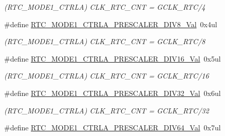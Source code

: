 \begin{DoxyCompactItemize}
\begin{DoxyCompactList}\small\item\em (R\+T\+C\+\_\+\+M\+O\+D\+E1\+\_\+\+C\+T\+R\+L\+A) C\+L\+K\+\_\+\+R\+T\+C\+\_\+\+C\+N\+T = G\+C\+L\+K\+\_\+\+R\+T\+C/4 \end{DoxyCompactList}\item 
\hypertarget{group___s_a_m_l21___r_t_c_gadb7983b0157872c129ad570190940b94}{}\#define \hyperlink{group___s_a_m_l21___r_t_c_gadb7983b0157872c129ad570190940b94}{R\+T\+C\+\_\+\+M\+O\+D\+E1\+\_\+\+C\+T\+R\+L\+A\+\_\+\+P\+R\+E\+S\+C\+A\+L\+E\+R\+\_\+\+D\+I\+V8\+\_\+\+Val}~0x4ul\label{group___s_a_m_l21___r_t_c_gadb7983b0157872c129ad570190940b94}

\begin{DoxyCompactList}\small\item\em (R\+T\+C\+\_\+\+M\+O\+D\+E1\+\_\+\+C\+T\+R\+L\+A) C\+L\+K\+\_\+\+R\+T\+C\+\_\+\+C\+N\+T = G\+C\+L\+K\+\_\+\+R\+T\+C/8 \end{DoxyCompactList}\item 
\hypertarget{group___s_a_m_l21___r_t_c_ga59bb15bf7c24c72a608b95c515938744}{}\#define \hyperlink{group___s_a_m_l21___r_t_c_ga59bb15bf7c24c72a608b95c515938744}{R\+T\+C\+\_\+\+M\+O\+D\+E1\+\_\+\+C\+T\+R\+L\+A\+\_\+\+P\+R\+E\+S\+C\+A\+L\+E\+R\+\_\+\+D\+I\+V16\+\_\+\+Val}~0x5ul\label{group___s_a_m_l21___r_t_c_ga59bb15bf7c24c72a608b95c515938744}

\begin{DoxyCompactList}\small\item\em (R\+T\+C\+\_\+\+M\+O\+D\+E1\+\_\+\+C\+T\+R\+L\+A) C\+L\+K\+\_\+\+R\+T\+C\+\_\+\+C\+N\+T = G\+C\+L\+K\+\_\+\+R\+T\+C/16 \end{DoxyCompactList}\item 
\hypertarget{group___s_a_m_l21___r_t_c_gaa70b57e6d6c684795ed419ad3ca49742}{}\#define \hyperlink{group___s_a_m_l21___r_t_c_gaa70b57e6d6c684795ed419ad3ca49742}{R\+T\+C\+\_\+\+M\+O\+D\+E1\+\_\+\+C\+T\+R\+L\+A\+\_\+\+P\+R\+E\+S\+C\+A\+L\+E\+R\+\_\+\+D\+I\+V32\+\_\+\+Val}~0x6ul\label{group___s_a_m_l21___r_t_c_gaa70b57e6d6c684795ed419ad3ca49742}

\begin{DoxyCompactList}\small\item\em (R\+T\+C\+\_\+\+M\+O\+D\+E1\+\_\+\+C\+T\+R\+L\+A) C\+L\+K\+\_\+\+R\+T\+C\+\_\+\+C\+N\+T = G\+C\+L\+K\+\_\+\+R\+T\+C/32 \end{DoxyCompactList}\item 
\hypertarget{group___s_a_m_l21___r_t_c_ga6b5465a569345c2a385df1c924db0db4}{}\#define \hyperlink{group___s_a_m_l21___r_t_c_ga6b5465a569345c2a385df1c924db0db4}{R\+T\+C\+\_\+\+M\+O\+D\+E1\+\_\+\+C\+T\+R\+L\+A\+\_\+\+P\+R\+E\+S\+C\+A\+L\+E\+R\+\_\+\+D\+I\+V64\+\_\+\+Val}~0x7ul\label{group___s_a_m_l21___r_t_c_ga6b5465a569345c2a385df1c924db0db4}


\end{DoxyCompactItemize}
